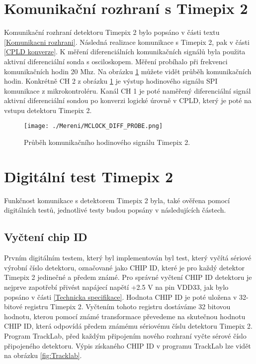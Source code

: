 \section{Komunikační rozhraní s Timepix 2}		%
Komunikační rozhraní detektoru Timepix 2 bylo popsáno v části textu \ref{Komunikacni rozhrani}. Následná  realizace komunikace s Timepix 2, pak v části \ref{CPLD konverze}. K měření diferenciálních komunikačních signálů byla použita aktivní diferenciální sonda s osciloskopem. Měření probíhalo při frekvenci komunikačních hodin 20 Mhz. Na obrázku \ref{fig:MCLOCK_DIFF_PROBE} můžete vidět průběh komunikačních hodin. Konkrétně CH 2 z obrázku \ref{fig:MCLOCK_DIFF_PROBE} je výstup hodinového signálu SPI komunikace z mikrokontroléru. Kanál CH 1 je poté naměřený diferenciální signál aktivní diferenciální sondou po konverzi logické úrovně v CPLD, který je poté na vstupu detektoru Timepix 2.  
\begin{figure}[h!]
	\centering
	\captionsetup{justification=centering}
	\texttt{[image: ./Mereni/MCLOCK\_DIFF\_PROBE.png]}
	\caption{Průběh komunikačního hodinového signálu Timepix 2.} 
	\label{fig:MCLOCK_DIFF_PROBE}
\end{figure}

\section{Digitální test Timepix 2} %
Funkčnost komunikace s detektorem Timepix 2 byla, také ověřena pomocí digitálních testů, jednotlivé testy budou popsány v následujících částech.
	\subsection{Vyčtení chip ID}
	Prvním digitálním testem, který byl implementován byl test, který vyčítá sériové výrobní číslo detektoru, označované jako CHIP ID, které je pro každý detektor Timepix 2 jedinečné a předem známé. Pro správné vyčtení CHIP ID detektoru je nejprve zapotřebí přivést napájecí napětí +2.5 V na pin VDD33, jak bylo popsáno v části \ref{Technicka specifikace}. Hodnota CHIP ID je poté uložena v 32-bitové registru Timepix 2. Vyčtením tohoto registru dostáváme 32 bitovou hodnotu, kterou pomocí známé transformace převedeme na skutečnou hodnotu CHIP ID, která odpovídá předem známému sériovému číslu detektoru Timepix 2. Program TrackLab, před každým připojením nového rozhraní vyčte sérové číslo připojeného detektoru. Výpis získaného CHIP ID v programu TrackLab lze vidět na obrázku \ref{fig:Tracklab}.

